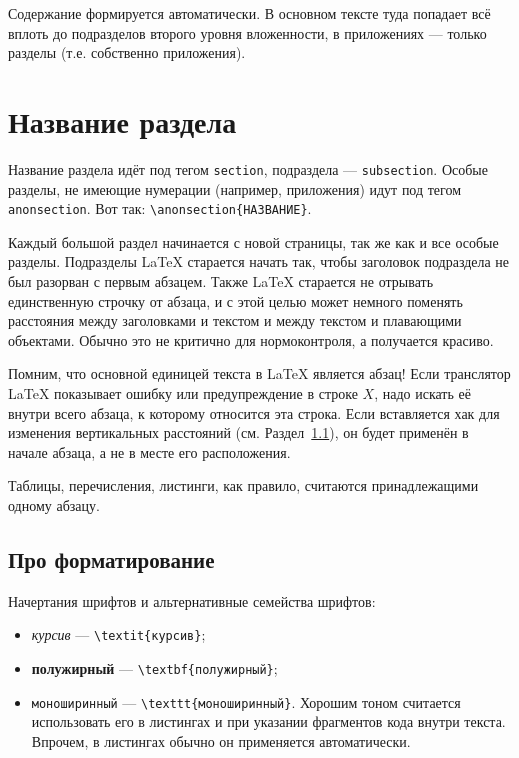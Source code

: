 \documentclass[14pt, russian]{scrartcl}
\begin{document}
Содержание формируется автоматически. В основном тексте туда попадает всё вплоть до подразделов второго уровня вложенности, в приложениях --- только разделы (т.е. собственно приложения).

\section{Название раздела}

Название раздела идёт под тегом \texttt{section}, подраздела --- \texttt{subsection}. Особые разделы, не имеющие нумерации (например, приложения) идут под тегом \texttt{anonsection}. Вот так: \texttt{\textbackslash anonsection\{НАЗВАНИЕ\}}.

Каждый большой раздел начинается с новой страницы, так же как и все особые разделы. Подразделы \LaTeX{} старается начать так, чтобы заголовок подраздела не был разорван с первым абзацем. Также \LaTeX{} старается не отрывать единственную строчку от абзаца, и с этой целью может немного поменять расстояния между заголовками и текстом и между текстом и плавающими объектами. Обычно это не критично для нормоконтроля, а получается красиво.

Помним, что основной единицей текста в \LaTeX{} является абзац! Если транслятор \LaTeX{} показывает ошибку или предупреждение в строке $X$, надо искать её внутри всего абзаца, к которому относится эта строка. Если вставляется хак для изменения вертикальных расстояний (см. Раздел~\ref{sect:formatting}), он будет применён в начале абзаца, а не в месте его расположения.

Таблицы, перечисления, листинги, как правило, считаются принадлежащими одному абзацу.

\subsection{Про форматирование}\label{sect:formatting}

Начертания шрифтов и альтернативные семейства шрифтов:
\begin{itemize}
\item \textit{курсив} --- \texttt{\textbackslash textit\{курсив\}};
\item \textbf{полужирный} --- \texttt{\textbackslash textbf\{полужирный\}};
\item \texttt{моноширинный} --- \texttt{\textbackslash texttt\{моноширинный\}}. Хорошим тоном считается использовать его в листингах и при указании фрагментов кода внутри текста. Впрочем, в листингах обычно он применяется автоматически.
\end{itemize}
\end{document}
